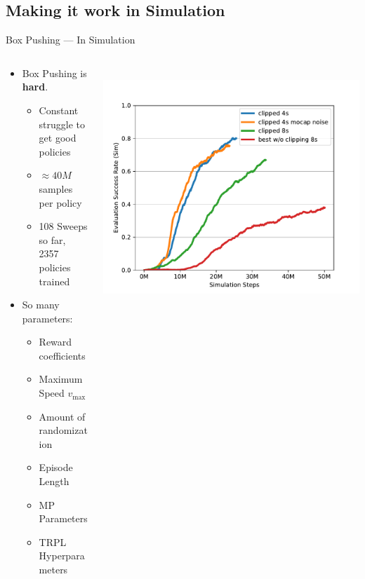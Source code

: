 \documentclass[16:9,en,navbarinfooter]{sdqbeamer}
\begin{document}
\subsection{Making it work in Simulation}
\begin{frame}{Box Pushing --- In Simulation}

\begin{columns}[t]
    \begin{column}{0.4\textwidth}
        \vspace{1cm}
        \begin{itemize}
            \item Box Pushing is \textbf{hard}.
            \begin{itemize}
                \item Constant struggle to get good policies
                \item $\approx 40M$ samples per policy
                \item 108 Sweeps so far, 2357 policies trained
            \end{itemize}
            \item So many parameters:
            \begin{itemize}
                \item Reward coefficients
                \item Maximum Speed $v_{\max}$
                \item Amount of randomization
                \item Episode Length
                \item MP Parameters
                \item TRPL Hyperparameters
            \end{itemize}
        \end{itemize}
    \end{column}
    \begin{column}{0.5\textwidth}
        \vspace{.2cm} \\
        \includegraphics[width=.9\linewidth]{media/clipping_reward.pdf}


\end{column}
\end{columns}
\end{frame}
\end{document}
